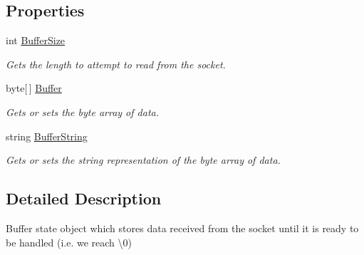 \subsection*{Properties}
\begin{DoxyCompactItemize}
\item 
\hypertarget{classSharpenguin_1_1Net_1_1PenguinSocket_1_1BufferState_afe932a3bee523454ac0b09b7194843df}{int \hyperlink{classSharpenguin_1_1Net_1_1PenguinSocket_1_1BufferState_afe932a3bee523454ac0b09b7194843df}{Buffer\-Size}}\label{classSharpenguin_1_1Net_1_1PenguinSocket_1_1BufferState_afe932a3bee523454ac0b09b7194843df}

\begin{DoxyCompactList}\small\item\em Gets the length to attempt to read from the socket. \end{DoxyCompactList}\item 
\hypertarget{classSharpenguin_1_1Net_1_1PenguinSocket_1_1BufferState_a3801f3011e8b0c2493c0b1ab08283866}{byte\mbox{[}$\,$\mbox{]} \hyperlink{classSharpenguin_1_1Net_1_1PenguinSocket_1_1BufferState_a3801f3011e8b0c2493c0b1ab08283866}{Buffer}}\label{classSharpenguin_1_1Net_1_1PenguinSocket_1_1BufferState_a3801f3011e8b0c2493c0b1ab08283866}

\begin{DoxyCompactList}\small\item\em Gets or sets the byte array of data. \end{DoxyCompactList}\item 
\hypertarget{classSharpenguin_1_1Net_1_1PenguinSocket_1_1BufferState_a21fb0f33aa590cf88f1d4edc553facf0}{string \hyperlink{classSharpenguin_1_1Net_1_1PenguinSocket_1_1BufferState_a21fb0f33aa590cf88f1d4edc553facf0}{Buffer\-String}}\label{classSharpenguin_1_1Net_1_1PenguinSocket_1_1BufferState_a21fb0f33aa590cf88f1d4edc553facf0}

\begin{DoxyCompactList}\small\item\em Gets or sets the string representation of the byte array of data. \end{DoxyCompactList}\end{DoxyCompactItemize}


\subsection{Detailed Description}
Buffer state object which stores data received from the socket until it is ready to be handled (i.\-e. we reach \textbackslash{}0) 

